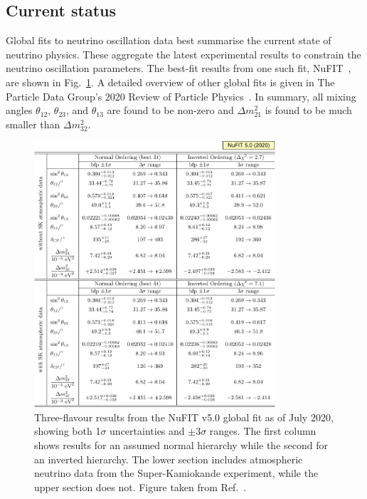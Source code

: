 \subsection{Current status} %
\label{sec:theory_status_current} %

Global fits to neutrino oscillation data best summarise the current state of neutrino physics.
These aggregate the latest experimental results to constrain the neutrino oscillation parameters.
The best-fit results from one such fit, NuFIT~\cite{esteban2019, esteban2020}, are shown in
Fig.~\ref{fig:best_fit}. A detailed overview of other global fits is given in The Particle Data
Group's 2020 Review of Particle Physics~\cite{particle2020}. In summary, all mixing angles
$\theta_{12}$, $\theta_{23}$, and $\theta_{13}$ are found to be non-zero and $\Delta m^{2}_{21}$
is found to be much smaller than $\Delta m^{2}_{32}$.

\begin{figure} %
    \includegraphics[origin=c,width=0.8\textwidth]{diagrams/3-theory/best_fit.pdf}
    \caption[Three-flavour results from the NuFIT v5.0 global neutrino oscillation fit]
    {Three-flavour results from the NuFIT v5.0 global fit as of July 2020, showing both 1$\sigma$
        uncertainties and $\pm 3 \sigma$ ranges. The first column shows results for an assumed
        normal hierarchy while the second for an inverted hierarchy. The lower section includes
        atmospheric neutrino data from the Super-Kamiokande experiment, while the upper section
        does not. Figure taken from Ref.~\cite{esteban2020}.}
    \label{fig:best_fit}
\end{figure}

